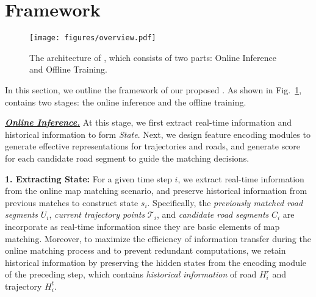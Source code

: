\section{Framework}
\label{sec:3}
\begin{figure}
  \centering  
  \texttt{[image: figures/overview.pdf]}
  \vspace{-0.15in}
  \caption{The architecture of \modelName, which consists of two parts: Online Inference and Offline Training. }
  \vspace{-0.1in}
  \label{fig:overview}
\end{figure}

In this section, we outline the framework of our proposed \textbf{\modelName}. As shown in Fig.~\ref{fig:overview}, \textbf{\modelName} contains two stages: the online inference and the offline training.

\noindent \underline{\textit{\textbf{Online Inference.}}} At this stage, we first extract real-time information and historical information to form \textit{State}. Next, we design feature encoding modules to generate effective representations for trajectories and roads, and generate score for each candidate road segment to guide the matching decisions.

\textbf{1. Extracting State:} For a given time step $i$, we extract real-time information from the online map matching scenario, and preserve historical information from previous matches to construct state $s_i$. Specifically, the \textit{previously matched road segments} $U_i$, \textit{current trajectory points} $\mathcal{T}_i$, and \textit{candidate road segments} $C_i$ are incorporate as real-time information since they are basic elements of map matching. Moreover, to maximize the efficiency of information transfer during the online matching process and to prevent redundant computations, we retain historical information by preserving the hidden states from the encoding module of the preceding step, which contains \textit{historical information} of road $H_i^r$ and trajectory $H_i^t$. 

